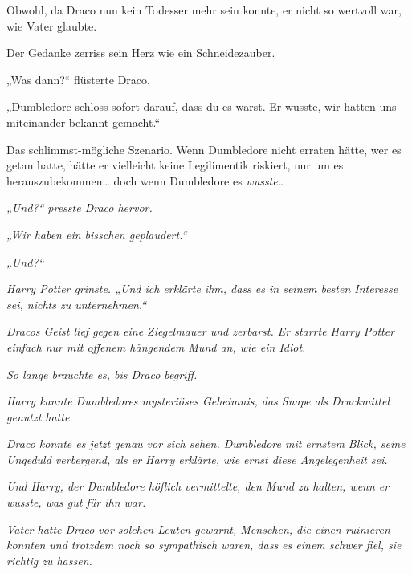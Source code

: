 {Obwohl, da Draco nun kein Todesser mehr sein konnte, er nicht so wertvoll war, wie Vater glaubte.

Der Gedanke zerriss sein Herz wie ein Schneidezauber.

„Was dann?“ flüsterte Draco.

„Dumbledore schloss sofort darauf, dass du es warst. Er wusste, wir hatten uns miteinander bekannt gemacht.“

Das schlimmst-mögliche Szenario. Wenn Dumbledore nicht erraten hätte, wer es getan hatte, hätte er vielleicht keine Legilimentik riskiert, nur um es herauszubekommen… doch wenn Dumbledore es \emph{wusste…}

\emph{„Und?“ presste Draco hervor.}

\emph{„Wir haben ein bisschen geplaudert.“}

\emph{„Und?“}

\emph{Harry Potter grinste. „Und ich erklärte ihm, dass es in seinem besten Interesse sei, nichts zu unternehmen.“}

\emph{Dracos Geist lief gegen eine Ziegelmauer und zerbarst. Er starrte Harry Potter einfach nur mit offenem hängendem Mund an, wie ein Idiot.}

\emph{So lange brauchte es, bis Draco begriff.}

\emph{Harry kannte Dumbledores mysteriöses Geheimnis, das Snape als Druckmittel genutzt hatte.}

\emph{Draco konnte es jetzt genau vor sich sehen. Dumbledore mit ernstem Blick, seine Ungeduld verbergend, als er Harry erklärte, wie ernst diese Angelegenheit sei.}

\emph{Und Harry, der Dumbledore höflich vermittelte, den Mund zu halten, wenn er wusste, was gut für ihn war.}

\emph{Vater hatte Draco vor solchen Leuten gewarnt, Menschen, die einen ruinieren konnten und trotzdem noch so sympathisch waren, dass es einem schwer fiel, sie richtig zu hassen.}

}
